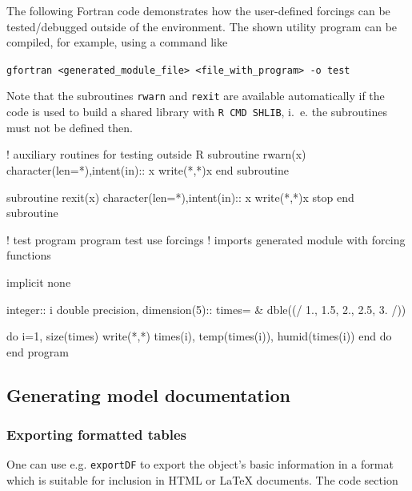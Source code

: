 \documentclass[times,onecolumn]{article}
\begin{document}
The following Fortran code demonstrates how the user-defined forcings can be tested/debugged outside of the  environment. The shown utility program can be compiled, for example, using a command like

\medskip
\verb|gfortran <generated_module_file> <file_with_program> -o test|

\medskip
Note that the subroutines \verb|rwarn| and \verb|rexit| are available automatically if the code is used to build a shared library with \verb|R CMD SHLIB|, i.~e. the subroutines must not be defined then.

\begin{shaded}
\begin{Schunk}
\begin{Soutput}
 ! auxiliary routines for testing outside R 
 subroutine rwarn(x) 
   character(len=*),intent(in):: x 
   write(*,*)x 
 end subroutine 
  
 subroutine rexit(x) 
   character(len=*),intent(in):: x 
   write(*,*)x 
   stop 
 end subroutine 
  
 ! test program 
 program test 
 use forcings  ! imports generated module with forcing functions 
  
 implicit none 
  
 integer:: i 
 double precision, dimension(5):: times= & 
   dble((/ 1., 1.5, 2., 2.5, 3. /)) 
  
 do i=1, size(times) 
   write(*,*) times(i), temp(times(i)), humid(times(i)) 
 end do 
 end program 
\end{Soutput}
\end{Schunk}
\end{shaded}


\subsection{Generating model documentation} \label{sec:advanced:doc}

\subsubsection{Exporting formatted tables} \label{sec:advanced:doc:tables}

One can use e.g. \verb|exportDF| to export the object's basic information in a format which is suitable for inclusion in HTML or \LaTeX{} documents. The code section
\end{document}
